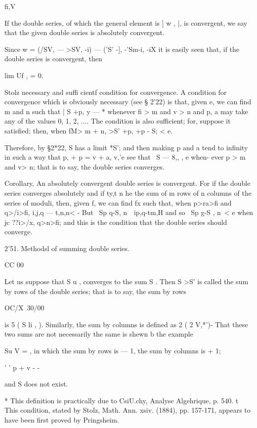  fi,V



If the double series, of which the general element is ] w , |, is
convergent, we say that the given double series is absolutely
convergent.

Since w = (/SV, — >SV, -i) — ('S' -], -'Sm-i, -iX it is easily seen
that, if the double series is convergent, then

lim Uf , = 0.

Stolz necessary and suffi cientf condition for convergence. A
condition for convergence which is obviously necessary (see § 2'22) is
that, given e, we can find m and n such that | S +p, y — *%
whenever fi > m and v > n and p, a may take any of the values 0, 1, 2,
.... The condition is also sufficient; for, suppose it satisfied;
then, when fM> m + n, >S' +p, +p - S; < e.

Therefore, by §2*22, S has a limit *S'; and then making p and a tend
to infinity in such a way that p, + p = v + a, v,'e see that \ S — 8,,
, e when- ever p > m and v> n; that is to say, the double series
converges.

Corollary, An absolutely convergent double series is convergent. For
if the double series converges absolutely and if ty,t n he the sum of
m rows of n columns of the series of moduli, then, given f, we can
find fx such that, when p>ra>fi and q>/i>fi, i,j,q — t,n,n< - But \ Sp
q-S, n\ \ ip,q-tm,H and so \ Sp g-S , n\ < e when jc ??i>/x, q>n>fi;
and this is the condition that the double series should converge.

2'51. Methodsl of summing double series.

CC 00

Let us suppose that S u , converges to the sum S . Then S >S' is
called the sum by rows of the double series; that is to say, the sum
by rows

OC/X\ 30/00\

is 5 ( S li , ). Similarly, the sum by columns is defined as 2 ( 2
V,*')- That these two sums are not necessarily the same is shewn b the
example

Su V = , in which the sum by rows is — 1, the sum by columns is + 1;

' ' p + v - -

and S does not exist.

* This definition is practically due to CsiU.chy, Analyse Algehrique,
p. 540. t This condition, stated by Stolz, Math. Ann. xsiv. (1884),
pp. 157-171, appears to have been first proved by Pringsheim.

